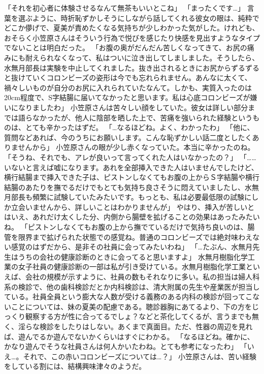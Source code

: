 「それを初心者に体験させるなんて無茶もいいとこね」
「まったくです…」
言葉を選ぶように、時折恥ずかしそうにしながら話してくれる彼女の眼は、純粋でどこか儚げで、夏美が責めたくなる気持ちが少しわかった気がした。けれども、おそらく小笠原さんはそういう行為で悦びを感じたり快感を見出すようなタイプでないことは明白だった。
「お腹の奥がだんだん苦しくなってきて、お尻の痛みにも耐えられなくなって、私はついに泣き出してしましました。そうしたら、水無月部長は実験を中止してくれました。抜き出されるときにお尻からずるずると抜けていくコロンビーズの姿形は今でも忘れられません。あんなに太くて、禍々しいものが自分のお尻に入れられていたなんて。しかも、実質入ったのは20cm程度で、S字結腸に届いてなかったと思います。私は心底コロンビーズが嫌いになりましたわ」
小笠原さんは苦々しい顔をしていた。彼女は詳しい部分までは語らなかったが、他人に陰部を晒した上で、苦痛を強いられた経験というものは、とても辛かったはずだ。
「…なるほどね。よく、わかったわ」
「他に、質問などあれば、今のうちにお願いします。こんな恥ずかしい話二度としたくありませんから」
小笠原さんの眼が少し赤くなっていた。本当に辛かったのね。
「そうね、それでも、アレが良いって言ってくれた人はいなかったの？」
「……いないと言えば嘘になります。あれを全部挿入できた人はいませんでしたけど、横行結腸まで挿入できた子は、ピストンしなくてもお腹の上からＳ字結腸や横行結腸のあたりを撫でるだけでもとても気持ち良さそうに悶えていましたし、水無月部長も頻繁に試験していたみたいです。もっとも、私は必要最低限の試験にしか立会いませんから、詳しいことはわかりませんが」
やはり、挿入が苦しいとはいえ、あれだけ太くした分、内側から腸壁を拡げることの効果はあったみたいね。
「ピストンしなくてもお腹の上から撫でているだけで気持ち良いのは、腸管を限界まで拡げられた状態での感覚ね。普通のコロンビーズでは絶対味わえない感覚のはずだから、是非その社員に会ってみたいわね」
「…たぶん、水無月先生はうちの会社の健康診断のときに会ってると思いますよ」
水無月樹脂化学工業の女子社員の健康診断の一部は私が引き受けている。水無月樹脂化学工業といえば、会社の規模が示すように、社員の数もそれなりに多い。私の担当は婦人科系の検診で、他の歯科検診だとか内科検診は、清大附属の先生や産業医が担当している。社員全員という膨大な人数が受ける義務のある内科の検診が回ってこないことについては、妹の夏美の配慮である。聴診器胸にあてるより、下の方をじっくり観察する方が性に合ってるでしょ？などと茶化してくるが、言うまでも無く、淫らな検診をしたりはしない。あくまで真面目。ただ、性器の周辺を見れば、遊んでるか遊んでないかくらいはすぐにわかる。
「なるほどね。確かに、かなり遊んでそうな社員さんは何人かいたわね。とても参考になったわ」
「いえ…。それで、この赤いコロンビーズについては…？」
小笠原さんは、苦い経験をしている割には、結構興味津々のようだ。

